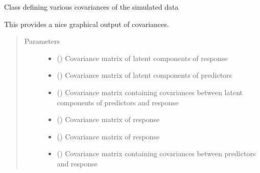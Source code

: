 \documentclass[letterpaper,10pt,english]{sphinxmanual}
\begin{document}
\begin{fulllineitems}
\label{\detokenize{Classes:pysimrel.Covariances}}
Class defining various covariances of the simulated data

This provides a nice graphical output of covariances.
\begin{quote}\begin{description}
\item[{Parameters}] \leavevmode\begin{itemize}
\item {} 
 () \textendash{} Covariance matrix of latent components of response

\item {} 
 () \textendash{} Covariance matrix of latent components of predictors

\item {} 
 () \textendash{} Covariance matrix containing covariances between latent components of predictors and response

\item {} 
 () \textendash{} Covariance matrix of response

\item {} 
 () \textendash{} Covariance matrix of response

\item {} 
 () \textendash{} Covariance matrix containing covariances between predictors and response

\end{itemize}

\end{description}\end{quote}

\end{fulllineitems}
\end{document}

